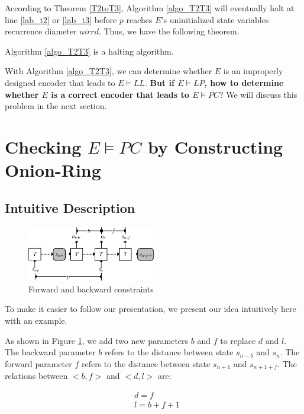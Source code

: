 \documentclass[journal]{IEEEtran}
\begin{document}
According to Theorem \ref{T2toT3},
Algorithm \ref{algo_T2T3} will eventually halt at line \ref{lab_t2} or \ref{lab_t3} before $p$ reaches $E$'s uninitialized state variables recurrence diameter $uirrd$.
Thus,
we have the following theorem.

\begin{theorem}\label{a1h}
Algorithm \ref{algo_T2T3} is a halting algorithm.
\end{theorem}

With Algorithm \ref{algo_T2T3},
we can determine whether $E$ is an improperly designed encoder that leads to $E\vDash LL$.
\textbf{But if $E\vDash LP$, how to determine whether $E$ is a correct encoder that leads to $E\vDash PC$}?
We will discuss this problem in the next section.


\section{Checking $E\vDash PC$ by Constructing Onion-Ring}\label{sec_t1t2}
\subsection{Intuitive Description}\label{subsec_intuitive}
\begin{figure}[b]
\begin{center}
\includegraphics[width=0.5\textwidth]{lr}
\end{center}
\caption{Forward and backward constraints}
  \label{lr}
\end{figure}

To make it easier to follow our presentation,
we present our idea intuitively here with an example.

As shown in Figure \ref{lr},
we add two new parameters $b$ and $f$ to replace $d$ and $l$.
The backward parameter $b$ refers to the distance between state $s_{n-b}$ and $s_n$.
The forward parameter $f$ refers to the distance between state $s_{n+1}$ and $s_{n+1+f}$.
The relations between $<b,f>$ and $<d,l>$ are:

\begin{equation}\label{eq_bfdl}
\begin{split}
&d=f\\
&l=b+f+1
\end{split}
\end{equation}
\end{document}
